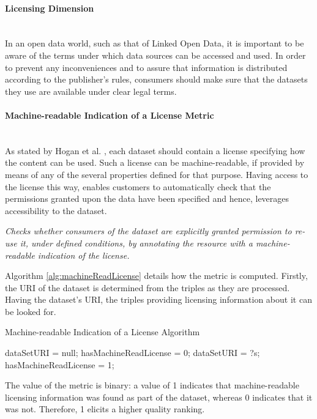 

\paragraph{Licensing Dimension}~\\ %
In an open data world, such as that of Linked Open Data, it is important to be aware of the terms under which data sources can be accessed and used. In order to prevent any inconveniences and to assure that information is distributed according to the publisher's rules, consumers should make sure that the datasets they use are available under clear legal terms.


\paragraph{Machine-readable Indication of a License Metric} ~\\ %
As stated by Hogan et al. \cite{Hogan2012:LDC}, each dataset should contain a license specifying how the content can be used. Such a license can be machine-readable, if provided by means of any of the several properties defined for that purpose. Having access to the license this way, enables customers to automatically check that the permissions granted upon the data have been specified and hence, leverages accessibility to the dataset.

\begin{mdframed}[style=metricdefinition]
\emph{Checks whether consumers of the dataset are explicitly granted permission to re-use it, under defined conditions, by annotating the resource with a machine-readable indication of the license.}
\end{mdframed}

Algorithm \ref{alg:machineReadLicense} details how the metric is computed. Firstly, the URI of the dataset is determined from the triples as they are processed. Having the dataset's URI, the triples providing licensing information about it can be looked for.
\begin{algorithm}
\caption{Machine-readable Indication of a License Algorithm} \label{alg:machineReadLicense}
\begin{algorithmic}[1]
\State dataSetURI = null;
\State hasMachineReadLicense = 0;
\EndProcedure
{}
\State dataSetURI = ?s;
\EndIf
{} 
\State hasMachineReadLicense = 1;
\EndIf ~\\
\EndProcedure
\end{algorithmic}
\end{algorithm}
The value of the metric is binary: a value of 1 indicates that machine-readable licensing information was found as part of the dataset, whereas 0 indicates that it was not. Therefore, 1 elicits a higher quality ranking.




